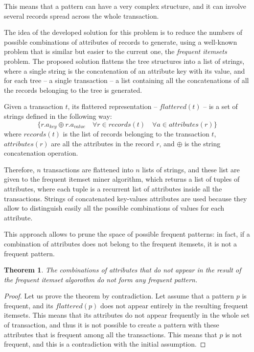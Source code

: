 \documentclass{acm_proc_article-sp-sigmod09}
\begin{document}
This means that a pattern can have a very complex structure, and it can involve several records spread across the whole transaction.

The idea of the developed solution for this problem is to reduce the numbers of possible combinations of attributes of records to generate, using a well-known problem that is similar but easier to the current one, the \emph{frequent itemsets} problem. The proposed solution flattens the tree structures into a list of strings, where a single string is the concatenation of an attribute key with its value, and for each tree -- a single transaction -- a list containing all the concatenations of all the records belonging to the tree is generated. 

\begin{definition}
Given a transaction $t$, its flattered representation -- $flattered(t)$ -- is a set of strings defined in the following way:
\[
\{r.a_{key} \oplus r.a_{value} \quad \forall r \in records(t) \quad \forall a \in attributes(r) \}
\]
where $records(t)$ is the list of records belonging to the transaction $t$, $attributes(r)$ are all the attributes in the record $r$, and $\oplus$ is the string concatenation operation.
\end{definition}

Therefore, $n$ transactions are flattened into $n$ lists of strings, and these list are given to the frequent itemset miner algorithm, which returns a list of tuples of attributes, where each tuple is a recurrent list of attributes inside all the transactions. Strings of concatenated key-values attributes are used because they allow to distinguish easily all the possible combinations of values for each attribute.

This approach allows to prune the space of possible frequent patterns: in fact, if a combination of attributes does not belong to the frequent itemsets, it is not a frequent pattern.

\newtheorem{theorem}{Theorem}
\begin{theorem}
The combinations of attributes that do not appear in the result of the frequent itemset algorothm do not form any frequent pattern.
\end{theorem}

\begin{proof}
Let us prove the theorem by contradiction. Let assume that a pattern $p$ is frequent, and its $flattered(p)$ does not appear entirely in the resulting frequent itemsets. This means that its attributes do not appear frequently in the whole set of transaction, and thus it is not possible to create a pattern with these attributes that is frequent among all the transactions. This means that $p$ is not frequent, and this is a contradiction with the initial assumption.
\end{proof}
\end{document}
